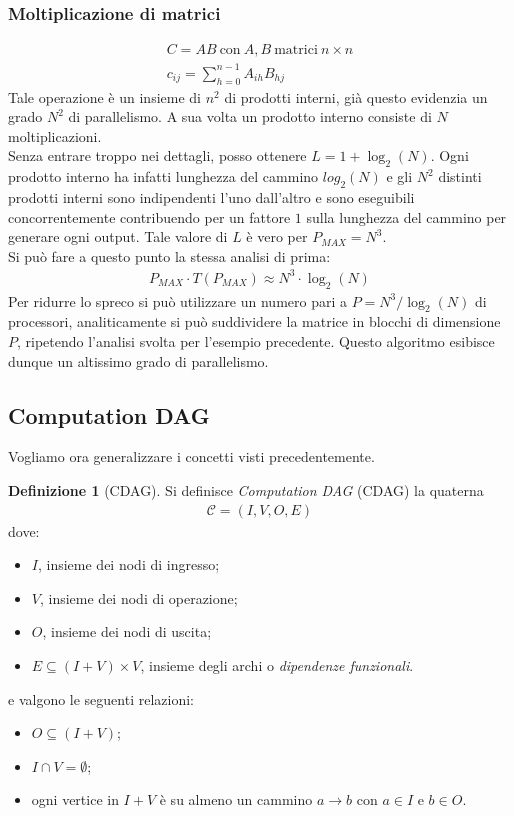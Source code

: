 \documentclass[a4paper,portrait,12pt]{article}
\theoremstyle{definition}
\newtheorem{definition}{Definizione}[section]
\begin{document}
\subsubsection{Moltiplicazione di matrici}
\begin{gather*}
C = AB\ \text{con}\ A,B\ \text{matrici}\ n\times n\\
c_{ij} = \sum_{h=0}^{n-1}A_{ih}B_{hj}
\end{gather*}
Tale operazione è un insieme di $n^2$ di prodotti interni, già questo evidenzia un grado $N^2$ di parallelismo.
A sua volta un prodotto interno consiste di $N$ moltiplicazioni.\\
Senza entrare troppo nei dettagli, posso ottenere $L = 1 + \log_2(N)$.
Ogni prodotto interno ha infatti lunghezza del cammino $log_2(N)$ e gli $N^2$ distinti prodotti interni sono indipendenti l’uno dall’altro e sono eseguibili concorrentemente contribuendo per un fattore $1$ sulla lunghezza del cammino per generare ogni output.
Tale valore di $L$ è vero per $P_{MAX} = N^3$.\\

Si può fare a questo punto la stessa analisi di prima:
\begin{align*}
P_{MAX} \cdot T(P_{MAX}) \approx N^3 \cdot \log_2(N)
\end{align*}
Per ridurre lo spreco si può utilizzare un numero pari a $P = N^3 / \log_2(N)$ di processori, analiticamente
si può suddividere la matrice in blocchi di dimensione $P$, ripetendo l’analisi svolta per l’esempio precedente.
Questo algoritmo esibisce dunque un altissimo grado di parallelismo.


\subsection{Computation DAG}

Vogliamo ora generalizzare i concetti visti precedentemente.

\theoremstyle{definition}
\begin{definition}[CDAG]
Si definisce \textit{Computation DAG} (CDAG) la quaterna
\begin{align*}
\mathcal{C} = (I, V, O, E)
\end{align*}
dove:
\begin{itemize}
\item $I$, insieme dei nodi di ingresso;
\item $V$, insieme dei nodi di operazione;
\item $O$, insieme dei nodi di uscita;
\item $E \subseteq (I + V) \times V$, insieme degli archi o \textit{dipendenze funzionali}.
\end{itemize}
e valgono le seguenti relazioni:
\begin{itemize}
\item $O \subseteq (I + V)$;
\item $I \cap V = \emptyset$;
\item ogni vertice in $I + V$ è su almeno un cammino $a\longrightarrow b$ con $a \in I$ e $b \in O$.
\end{itemize}
\end{definition}
\end{document}
